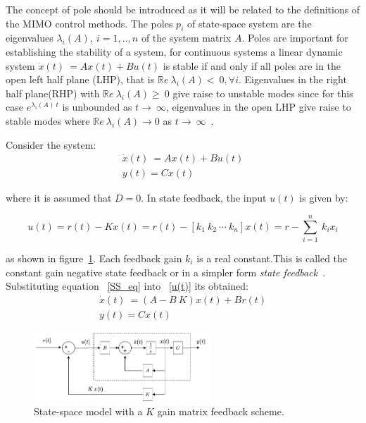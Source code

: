 The concept of pole should be introduced as it will be related to  the definitions of the MIMO control methods. The poles $p_i$ of state-space system are the eigenvalues $\lambda_i(A),~i=1,..,n$ of the system matrix $A$. Poles are important for establishing the stability of a system, for continuous systems a linear dynamic system  $	\dot{x}(t)~=Ax(t)+Bu(t)$ is stable if and only if all poles are in the open left half plane (LHP), that is $\mathbb{R}e~{\lambda_i(A)}<~0, \forall i$. Eigenvalues in the right half plane(RHP) with  $\mathbb{R}e~{\lambda_i(A)}\geq~0$ give raise to unstable modes since for this case $e^{\lambda_i(A)~t}$ is unbounded as $t\rightarrow~\infty$,  eigenvalues in the open LHP give raise to stable modes where $\mathbb{R}e~{\lambda_i(A)} \rightarrow 0$ as $t\rightarrow~\infty$~\cite[Chapter~4]{Skogestad}.
\smallskip

Consider the system:
\begin{align} 
	\dot{x}(t)~=Ax(t)+Bu(t) 	\label{SS_eq}\\
y(t)=Cx(t) \nonumber
\end{align}

where it is assumed that $D=0$. In state feedback, the input $u(t)$ is given by:

\begin{equation}
	u(t)=r(t)-Kx(t) = r(t)-[k_1~ k_2~\cdots ~k_n] x(t)=r-\sum_{i=1}^{n}~k_ix_i
	\label{u(t)}
\end{equation}

as shown in figure~\ref{SS_schm}. Each feedback gain $k_i$ is a real constant.This is called the constant gain negative state feedback or in a simpler form \textit{state feedback}~\cite{Chen1999}. Substituting equation ~\ref{SS_eq} into ~\ref{u(t)} its obtained:
\begin{align} 
\dot{x}(t)~=(A-B~K)x(t)+Br(t) \label{SS_eq_feed} \\
y(t)=Cx(t) \nonumber
\end{align}



\begin{figure}[h]
	\centering
	\includegraphics[width=0.6\textwidth]{Chp2/SS_scheme.png}
	\caption{  State-space model with a $K$ gain matrix feedback scheme.\label{SS_schm}}
\end{figure}


